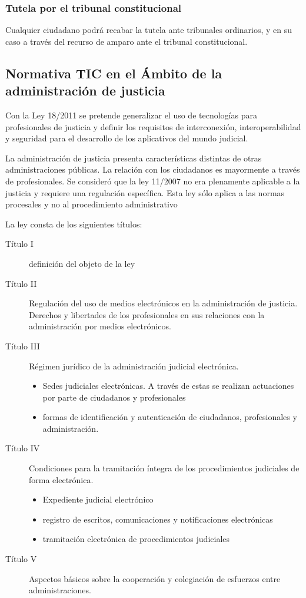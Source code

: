     \subsubsection{Tutela por el tribunal constitucional} %
        Cualquier ciudadano podrá recabar la tutela ante tribunales ordinarios, y en su caso a través del recurso de amparo ante el tribunal constitucional.

\subsection{Normativa TIC en el Ámbito de la administración de justicia} %
    Con la Ley 18/2011 se pretende generalizar el uso de tecnologías para profesionales de justicia y definir los requisitos de interconexión, interoperabilidad y seguridad para el desarrollo de los aplicativos del mundo judicial.

    La administración de justicia presenta características distintas de otras administraciones públicas. La relación con los ciudadanos es mayormente a través de profesionales. Se consideró que la ley 11/2007 no era plenamente aplicable a la justicia y requiere una regulación específica. Esta ley sólo aplica a las normas procesales y no al procedimiento administrativo

    La ley consta de los siguientes títulos:
    \begin{description}
        \item[Título I] definición del objeto de la ley
        \item[Título II] Regulación del uso de medios electrónicos en la administración de justicia. Derechos y libertades de los profesionales en sus relaciones con la administración por medios electrónicos.
        \item[Título III] Régimen jurídico de la administración judicial electrónica. \begin{itemize}
            \item Sedes judiciales electrónicas. A través de estas se realizan actuaciones por parte de ciudadanos y profesionales
            \item formas de identificación y autenticación de ciudadanos, profesionales y administración.
        \end{itemize}
        \item[Título IV] Condiciones para la tramitación íntegra de los procedimientos judiciales de forma electrónica. \begin{itemize}
            \item Expediente judicial electrónico
            \item registro de escritos, comunicaciones y notificaciones electrónicas
            \item tramitación electrónica de procedimientos judiciales
        \end{itemize}
        \item[Título V] Aspectos básicos sobre la cooperación y colegiación de esfuerzos entre administraciones.
    \end{description}

